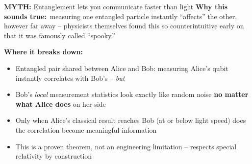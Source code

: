 \documentclass[aspectratio=169,11pt]{beamer}
\newcommand{\myth}[1]{\textbf{\alert{MYTH:}} #1}
\newcommand{\soundstruelabel}{\textbf{\textcolor{qViolet}{Why this sounds true:}}}
\newcommand{\actuallylabel}{\textbf{\textcolor{qRed}{Where it breaks down:}}}
\begin{document}
\begin{frame}{\myth{Entanglement lets you communicate faster than light}}
  \soundstruelabel\ measuring one entangled particle instantly
  ``affects'' the other, however far away -- physicists themselves found
  this so counterintuitive early on that it was famously called
  ``spooky.''

  \vspace{2mm}
  \actuallylabel
  \begin{itemize}
    \item Entangled pair shared between Alice and Bob: measuring Alice's
          qubit instantly correlates with Bob's -- \emph{but}
    \item Bob's \emph{local} measurement statistics look exactly like random
          noise \textbf{no matter what Alice does} on her side
    \item Only when Alice's classical result reaches Bob (at or below light
          speed) does the correlation become meaningful information
    \item This is a proven theorem, not an engineering limitation --
          respects special relativity by construction
  \end{itemize}
\end{frame}
\end{document}
